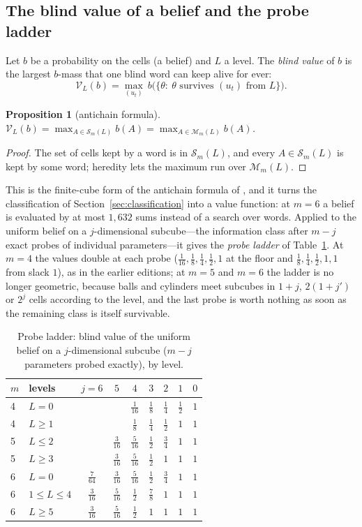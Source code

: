 \documentclass[11pt,a4paper]{article}
\theoremstyle{plain}
\newtheorem{proposition}[theorem]{Proposition}
\theoremstyle{definition}
\theoremstyle{remark}
\newcommand{\calM}{\mathcal{M}}
\newcommand{\calS}{\mathcal{S}}
\newcommand{\tfr}[2]{\tfrac{#1}{#2}}
\begin{document}
\subsection{The blind value of a belief and the probe ladder}
Let $b$ be a probability on the cells (a belief) and $L$ a level. The \emph{blind value} of $b$ is the largest $b$-mass that one blind word can keep alive for ever:
\[\mathcal V_L(b)=\max_{(u_t)}\ b\big(\{\theta:\ \theta\text{ survives }(u_t)\text{ from }L\}\big).\]
\begin{proposition}[antichain formula]\label{prop:antichain}
$\mathcal V_L(b)=\max_{A\in\calS_m(L)}b(A)=\max_{A\in\calM_m(L)}b(A)$.
\end{proposition}
\begin{proof}
The set of cells kept by a word is in $\calS_m(L)$, and every $A\in\calS_m(L)$ is kept by some word; heredity lets the maximum run over $\calM_m(L)$.
\end{proof}
This is the finite-cube form of the antichain formula of \cite{Abaee2026prob}, and it turns the classification of Section~\ref{sec:classification} into a value function: at $m=6$ a belief is evaluated by at most $1{,}632$ sums instead of a search over words. Applied to the uniform belief on a $j$-dimensional subcube---the information class after $m-j$ exact probes of individual parameters---it gives the \emph{probe ladder} of Table~\ref{tab:ladder}. At $m=4$ the values double at each probe ($\tfr1{16},\tfr18,\tfr14,\tfr12,1$ at the floor and $\tfr18,\tfr14,\tfr12,1,1$ from slack $1$), as in the earlier editions; at $m=5$ and $m=6$ the ladder is no longer geometric, because balls and cylinders meet subcubes in $1+j$, $2(1+j')$ or $2^j$ cells according to the level, and the last probe is worth nothing as soon as the remaining class is itself survivable.

\begin{table}[t]
\centering\small
\caption{Probe ladder: blind value of the uniform belief on a $j$-dimensional subcube ($m-j$ parameters probed exactly), by level.}
\label{tab:ladder}
\begin{tabular}{llccccccc}
\toprule
$m$ & levels & $j{=}6$ & $5$ & $4$ & $3$ & $2$ & $1$ & $0$\\
\midrule
4 & $L=0$ & & & $\tfr1{16}$ & $\tfr18$ & $\tfr14$ & $\tfr12$ & $1$\\
4 & $L\ge1$ & & & $\tfr18$ & $\tfr14$ & $\tfr12$ & $1$ & $1$\\
5 & $L\le2$ & & $\tfr3{16}$ & $\tfr5{16}$ & $\tfr12$ & $\tfr34$ & $1$ & $1$\\
5 & $L\ge3$ & & $\tfr3{16}$ & $\tfr5{16}$ & $\tfr12$ & $1$ & $1$ & $1$\\
6 & $L=0$ & $\tfr7{64}$ & $\tfr3{16}$ & $\tfr5{16}$ & $\tfr12$ & $\tfr34$ & $1$ & $1$\\
6 & $1\le L\le4$ & $\tfr3{16}$ & $\tfr5{16}$ & $\tfr12$ & $\tfr78$ & $1$ & $1$ & $1$\\
6 & $L\ge5$ & $\tfr3{16}$ & $\tfr5{16}$ & $\tfr12$ & $1$ & $1$ & $1$ & $1$\\
\bottomrule
\end{tabular}
\end{table}
\end{document}

